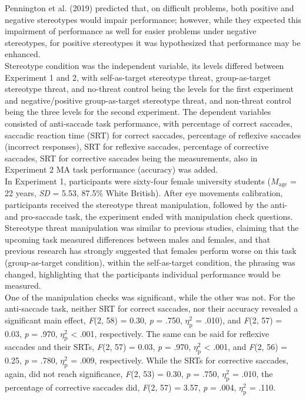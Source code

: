 \documentclass[
  stu,floatsintext]{apa7}
\begin{document}
Pennington et al. (2019) predicted that, on difficult problems, both positive and negative stereotypes would impair performance; however, while they expected this impairment of performance as well for easier problems under negative stereotypes, for positive stereotypes it was hypothesized that performance may be enhanced.\\
Stereotype condition was the independent variable, its levels differed between Experiment 1 and 2, with self-as-target stereotype threat, group-as-target stereotype threat, and no-threat control being the levels for the first experiment and negative/positive group-as-target stereotype threat, and non-threat control being the three levels for the second experiment.
The dependent variables consisted of anti-saccade task performance, with percentage of correct saccades, saccadic reaction time (SRT) for correct saccades, percentage of reflexive saccades (incorrect responses), SRT for reflexive saccades, percentage of corrective saccades, SRT for corrective saccades being the measurements, also in Experiment 2 MA task performance (accuracy) was added.\\
In Experiment 1, participants were sixty-four female university students (\(M_{\text{age}}\) = 22 years, \emph{SD} = 5.53, 87.5\% White British).
After eye movements calibration, participants received the stereotype threat manipulation, followed by the anti- and pro-saccade task, the experiment ended with manipulation check questions.
Stereotype threat manipulation was similar to previous studies, claiming that the upcoming task measured differences between males and females, and that previous research has strongly suggested that females perform worse on this task (group-as-target condition), within the self-as-target condition, the phrasing was changed, highlighting that the participants individual performance would be measured.\\
One of the manipulation checks was significant, while the other was not.
For the anti-saccade task, neither SRT for correct saccades, nor their accuracy revealed a significant main effect, \emph{F}(2, 58) = 0.30, \emph{p} = .750, \(\eta^{2}_{\text{p}}\) = .010), and \emph{F}(2, 57) = 0.03, \emph{p} = .970, \(\eta^{2}_{\text{p}}\) \textless{} .001, respectively.
The same can be said for reflexive saccades and their SRTs, \emph{F}(2, 57) = 0.03, \emph{p} = .970, \(\eta^{2}_{\text{p}}\) \textless{} .001, and \emph{F}(2, 56) = 0.25, \emph{p} = .780, \(\eta^{2}_{\text{p}}\) = .009, respectively.
While the SRTs for corrective saccades, again, did not reach significance, \emph{F}(2, 53) = 0.30, \emph{p} = .750, \(\eta^{2}_{\text{p}}\) = .010, the percentage of corrective saccades did, \emph{F}(2, 57) = 3.57, \emph{p} = .004, \(\eta^{2}_{\text{p}}\) = .110.\\
\end{document}
